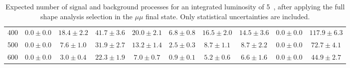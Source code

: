 \begin{table}[!ht]
{\begin{center}
\begin{tabular}{l | c c | c c c c c c c }
400 & $0.0\pm0.0$ & $18.4\pm2.2$ & $41.7\pm3.6$ & $20.0\pm2.1$ & $6.8\pm0.8$ & $16.5\pm2.0$ & $14.5\pm3.6$ & $0.0\pm0.0$ & $117.9\pm6.3$ \\
500 & $0.0\pm0.0$ & $7.6\pm1.0$ & $31.9\pm2.7$ & $13.2\pm1.4$ & $2.5\pm0.3$ & $8.7\pm1.1$ & $8.7\pm2.2$ & $0.0\pm0.0$ & $72.7\pm4.1$ \\
600 & $0.0\pm0.0$ & $3.0\pm0.4$ & $22.3\pm1.9$ & $7.0\pm0.7$ & $0.9\pm0.1$ & $5.2\pm0.6$ & $6.6\pm1.6$ & $0.0\pm0.0$ & $44.9\pm2.7$ \\
\hline
\end{tabular}
\label{tab:yield_mc_5fb_mm}
\end{center}
}
\caption{\fixme Expected number of signal and background processes for an integrated luminosity of 5~\ifb, 
after applying the full shape analysis selection in the $\mu\mu$ final state. Only statistical uncertainties are included.}
\end{table}
